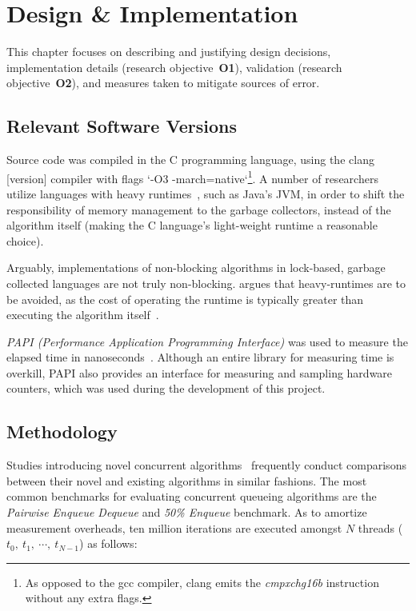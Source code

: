\chapter{Design \& Implementation}
This chapter focuses on describing and justifying design decisions,
implementation details (research objective~\textbf{O1}),
validation (research objective~\textbf{O2}), and measures
taken to mitigate sources of error.

\section{Relevant Software Versions}
Source code was compiled in the C programming language, using the clang
[version] compiler with flags `-O3 -march=native`\footnote{As opposed to the
gcc compiler, clang emits the \emph{cmpxchg16b} instruction without any extra flags.}. A number of researchers
utilize languages with heavy runtimes~\citep{kogan2011wait}, such as Java's JVM,
in order to shift the responsibility of memory management to the garbage
collectors, instead of the algorithm itself (making the C language's
light-weight runtime a reasonable choice).

Arguably, implementations of non-blocking algorithms in lock-based, garbage
collected languages are not truly non-blocking. \citeauthor{fog2020optimizing} argues that heavy-runtimes
are to be avoided, as the cost of operating the runtime is
typically greater than executing the algorithm
itself~\citep{fog2020optimizing}.

\emph{PAPI (Performance Application Programming Interface)} was used to measure
the elapsed time in nanoseconds~\citep{terpstra2010papi}. Although an entire library for measuring time 
is overkill, PAPI also provides an interface for measuring and
sampling hardware counters, which was used during the development of this project.


\section{Methodology}

Studies introducing novel concurrent
algorithms~\citep{michael1996simple,valois1994queues,kogan2011wait,hoffman2007baskets,yang2016wait}
frequently conduct comparisons between their novel and existing algorithms in
similar fashions. The most common benchmarks for evaluating concurrent queueing
algorithms are the \emph{Pairwise Enqueue Dequeue} and \emph{50\% Enqueue}
benchmark. As to amortize measurement overheads, ten million iterations are
executed amongst $N$ threads ($t_0,~t_1,~\cdots,~t_{N-1}$) as follows: 

